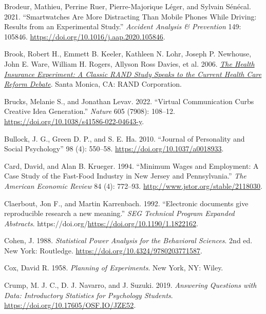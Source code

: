 \documentclass[
  11pt,
  letterpaper,
]{scrbook}
\newlength{\cslhangindent}
\newlength{\cslentryspacingunit} %
\newenvironment{CSLReferences}[2] %
 {%
  \setlength{\parindent}{0pt}
  \ifodd #1
  \let\oldpar\par
  \def\par{\hangindent=\cslhangindent\oldpar}
  \fi
  \setlength{\parskip}{#2\cslentryspacingunit}
 }%
 {}
\theoremstyle{definition}
\theoremstyle{remark}
\begin{document}
\begin{CSLReferences}{1}{0}
\leavevmode{}%
Brodeur, Mathieu, Perrine Ruer, Pierre-Majorique Léger, and Sylvain
Sénécal. 2021. {``Smartwatches Are More Distracting Than Mobile Phones
While Driving: Results from an Experimental Study.''} \emph{Accident
Analysis \& Prevention} 149: 105846.
\url{https://doi.org/10.1016/j.aap.2020.105846}.

\leavevmode{}%
Brook, Robert H., Emmett B. Keeler, Kathleen N. Lohr, Joseph P.
Newhouse, John E. Ware, William H. Rogers, Allyson Ross Davies, et al.
2006. \emph{\href{}{The {H}ealth {I}nsurance {E}xperiment: A Classic
{RAND} Study Speaks to the Current Health Care Reform Debate}}. Santa
Monica, CA: RAND Corporation.

\leavevmode{}%
Brucks, Melanie S., and Jonathan Levav. 2022. {``Virtual Communication
Curbs Creative Idea Generation.''} \emph{Nature} 605 (7908): 108--12.
\url{https://doi.org/10.1038/s41586-022-04643-y}.

\leavevmode{}%
Bullock, J. G., Green D. P., and S. E. Ha. 2010. {``Journal of
Personality and Social Psychology''} 98 (4): 550--58.
\url{https://doi.org/10.1037/a0018933}.

\leavevmode{}%
Card, David, and Alan B. Krueger. 1994. {``Minimum Wages and Employment:
A Case Study of the Fast-Food Industry in {N}ew {J}ersey and
{P}ennsylvania.''} \emph{The American Economic Review} 84 (4): 772--93.
\url{http://www.jstor.org/stable/2118030}.

\leavevmode{}%
Claerbout, Jon F., and Martin Karrenbach. 1992. {``{Electronic documents
give reproducible research a new meaning}.''} \emph{SEG Technical
Program Expanded Abstracts}.
https://doi.org/\url{https://doi.org/10.1190/1.1822162}.

\leavevmode{}%
Cohen, J. 1988. \emph{Statistical Power Analysis for the Behavioral
Sciences}. 2nd ed. New York: Routledge.
\url{https://doi.org/10.4324/9780203771587}.

\leavevmode{}%
Cox, David R. 1958. \emph{Planning of Experiments}. New York, NY: Wiley.

\leavevmode{}%
Crump, M. J. C., D. J. Navarro, and J. Suzuki. 2019. \emph{Answering
Questions with Data: Introductory Statistics for Psychology Students}.
\url{https://doi.org/10.17605/OSF.IO/JZE52}.


\end{CSLReferences}
\end{document}
